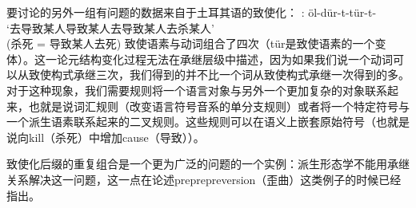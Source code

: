 要讨论的另外一组有问题的数据来自于土耳其语的致使化\citep[]{Lewis67a-u}：
\citep[]{Lewis67a-u}:
\ea
öl-dür-t-tür-t- \\
`去导致某人导致某人去导致某人去杀某人'\\
(杀死 = 导致某人去死)
\z
致使语素与动词组合了四次（tür是致使语素的一个变体）。这一论元结构变化过程无法在承继层级中描述，因为如果我们说一个动词可以从致使构式承继三次，我们得到的并不比一个词从致使构式承继一次得到的多。对于这种现象，我们需要规则将一个语言对象与另外一个更加复杂的对象联系起来，也就是说词汇规则（改变语言符号音系的单分支规则）或者将一个特定符号与一个派生语素联系起来的二叉规则。这些规则可以在语义上嵌套原始符号（也就是说向kill（杀死）中增加cause（导致））。

致使化后缀的重复组合是一个更为广泛的问题的一个实例：派生形态学不能用承继关系解决这一问题，这一点\citet{KN93a}在论述preprepreversion（歪曲）这类例子的时候已经指出。

